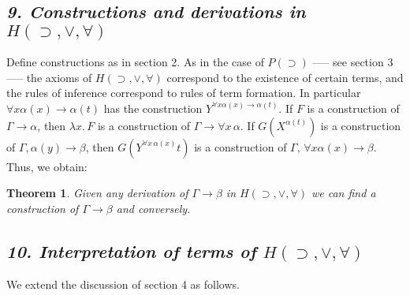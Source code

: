 \documentclass[12pt]{article}
\def\imp{\rightarrow}
\def\l{\lambda}
\def\limp{\supset}
\def\PI{P(\limp)}
\def\G{\Gamma}
\def\a{\alpha}
\def\b{\beta}
\def\gimpb{\G \imp \b}
\def\gimpa{\G \imp \a}
\def\HIMP{H(\limp, \lor, \forall)}
\newtheorem{theorem}{Theorem}
\begin{document}
\subsection{\it 9. Constructions and derivations in \texorpdfstring{$\HIMP$}{H(⊃, ∨, ∀)}}

Define constructions as in section 2. As in the case of $\PI$ —-- see section 3 —-- the axioms of $\HIMP$ correspond to the existence of
certain terms, and the rules of inference correspond to rules of term formation. In particular $\forall x \a(x) \imp \a(t)$ has the
construction $Y^{\forall x  \a(x) \imp \a(t)}$. If $F$ is a construction of $\gimpa$, then $\l x. \, F$ is a construction of $\G \imp \forall x \, \a$. If $G(X^{\a(t)})$ is a construction of $\G,\a(y) \imp \b$, then $G(Y^{\forall x \, \a (x)} t)$ is a construction of 
$\G, \, \forall x \a (x) \imp \b$. Thus, we obtain:

\begin{theorem}
Given any derivation of $\gimpb$ in $\HIMP$ we can find a construction of $\gimpb$ and conversely.
\end{theorem}

\subsection{\it 10. Interpretation of terms of \texorpdfstring{$\HIMP$}{H(⊃, ∨, ∀)}}

We extend the discussion of section 4 as follows.
\end{document}
